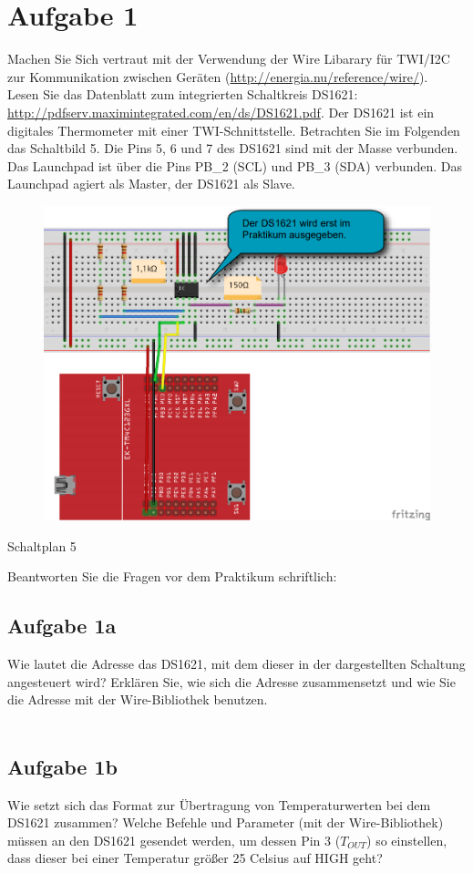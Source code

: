 \newpage
\section{Aufgabe 1}
Machen Sie Sich vertraut mit der Verwendung der Wire Libarary für TWI/I2C zur Kommunikation zwischen Geräten (\url{http://energia.nu/reference/wire/}).\\
Lesen Sie das Datenblatt zum integrierten Schaltkreis DS1621:\\
\url{http://pdfserv.maximintegrated.com/en/ds/DS1621.pdf}. Der DS1621 ist ein digitales Thermometer mit einer TWI-Schnittstelle. Betrachten Sie im Folgenden das Schaltbild 5. Die Pins 5, 6 und 7 des DS1621 sind mit der Masse verbunden. Das Launchpad ist über die Pins PB\_2 (SCL) und PB\_3 (SDA) verbunden. Das Launchpad agiert als Master, der DS1621 als Slave.
\begin{figure}[h]
	\centering
	\includegraphics[width=0.7\linewidth]{images/Schaltplan5}
	\label{fig:Schaltplan5}
\end{figure}
\begin{center}
	Schaltplan 5
\end{center}
Beantworten Sie die Fragen vor dem Praktikum schriftlich:
\subsection{Aufgabe 1a}
Wie lautet die Adresse das DS1621, mit dem dieser in der dargestellten Schaltung angesteuert wird? Erklären Sie, wie sich die Adresse zusammensetzt und wie Sie die Adresse mit der Wire-Bibliothek benutzen.\\ \\

\subsection{Aufgabe 1b}
Wie setzt sich das Format zur Übertragung von Temperaturwerten bei dem DS1621 zusammen? Welche Befehle und Parameter (mit der Wire-Bibliothek) müssen an den DS1621 gesendet werden, um dessen Pin 3 ($T_{OUT}$) so einstellen, dass dieser bei einer Temperatur grö\ss{}er 25\textdegree{} Celsius auf HIGH geht?\\ \\

